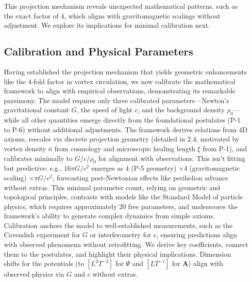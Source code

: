 \medskip

This projection mechanism reveals unexpected mathematical patterns, such as the exact factor of 4, which aligns with gravitomagnetic scalings without adjustment. We explore its implications for minimal calibration next.

\subsection{Calibration and Physical Parameters}

Having established the projection mechanism that yields geometric enhancements like the 4-fold factor in vortex circulation, we now calibrate the mathematical framework to align with empirical observations, demonstrating its remarkable parsimony. The model requires only three calibrated parameters---Newton's gravitational constant $G$, the speed of light $c$, and the background density $\rho_0$---while all other quantities emerge directly from the foundational postulates (P-1 to P-6) without additional adjustments. The framework derives relations from 4D axioms, rescales via discrete projection geometry (detailed in 2.4, motivated by vortex density $\bar{n}$ from cosmology and microscopic healing length $\xi$ from P-1), and calibrates minimally to $G$/$c$/$\rho_0$ for alignment with observations. This isn't fitting but predictive: e.g., $16\pi G/c^2$ emerges as $4$ (P-5 geometry) $\times 4$ (gravitomagnetic scaling) $\times \pi G/c^2$, forecasting post-Newtonian effects like perihelion advance without extras. This minimal parameter count, relying on geometric and topological principles, contrasts with models like the Standard Model of particle physics, which requires approximately 20 free parameters, and underscores the framework's ability to generate complex dynamics from simple axioms. Calibration anchors the model to well-established measurements, such as the Cavendish experiment for $G$ or interferometry for $c$, ensuring predictions align with observed phenomena without retrofitting. We derive key coefficients, connect them to the postulates, and highlight their physical implications. Dimension shifts for the potentials (to $[L^2 T^{-2}]$ for $\Psi$ and $[L T^{-1}]$ for $\mathbf{A}$) align with observed physics via $G$ and $c$ without extras.


